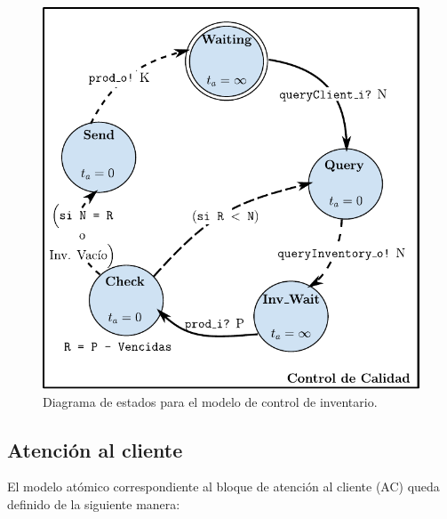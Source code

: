 \documentclass[10pt]{article}
\begin{document}
\begin{figure}[htbp]
	\centering
	\includegraphics{img/controlCalidaddevsgraph}
	\caption{Diagrama de estados para el modelo de control de inventario.}
	\label{fig:CC-estados}
\end{figure}

\subsection{Atención al cliente\label{sec:AC}}
El modelo atómico correspondiente al bloque de atención al cliente (AC) queda definido de la siguiente manera:
\end{document}
